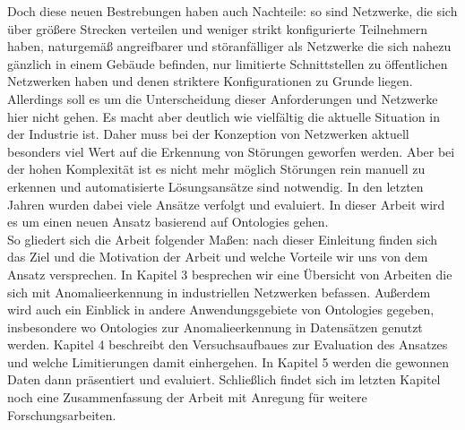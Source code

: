 Doch diese neuen Bestrebungen haben auch Nachteile: so sind Netzwerke, die sich über größere Strecken verteilen und weniger strikt konfigurierte Teilnehmern haben, naturgemäß angreifbarer und störanfälliger als Netzwerke die sich nahezu gänzlich in einem Gebäude befinden, nur limitierte Schnittstellen zu öffentlichen Netzwerken haben und denen striktere Konfigurationen zu Grunde liegen. Allerdings soll es um die Unterscheidung dieser Anforderungen und Netzwerke hier nicht gehen. Es macht aber deutlich wie vielfältig die aktuelle Situation in der Industrie ist. Daher muss bei der Konzeption von Netzwerken aktuell besonders viel Wert auf die Erkennung von Störungen geworfen werden. Aber bei der hohen Komplexität ist es nicht mehr möglich Störungen rein manuell zu erkennen und automatisierte Lösungsansätze sind notwendig. In den letzten Jahren wurden dabei viele Ansätze verfolgt und evaluiert. In dieser Arbeit wird es um einen neuen Ansatz basierend auf \Glspl{Ontologie} gehen.\\
So gliedert sich die Arbeit folgender Maßen: nach dieser Einleitung finden sich das Ziel und die Motivation der Arbeit und welche Vorteile wir uns von dem Ansatz versprechen. In Kapitel 3 besprechen wir eine Übersicht von Arbeiten die sich mit Anomalieerkennung in industriellen Netzwerken befassen. Außerdem wird auch ein Einblick in andere Anwendungsgebiete von \Glspl{Ontologie} gegeben, insbesondere wo \Glspl{Ontologie} zur Anomalieerkennung in Datensätzen genutzt werden. Kapitel 4 beschreibt den Versuchsaufbaues zur Evaluation des Ansatzes und welche Limitierungen damit einhergehen. In Kapitel 5 werden die gewonnen Daten dann präsentiert und evaluiert. Schließlich findet sich im letzten Kapitel noch eine Zusammenfassung der Arbeit mit Anregung für weitere Forschungsarbeiten.